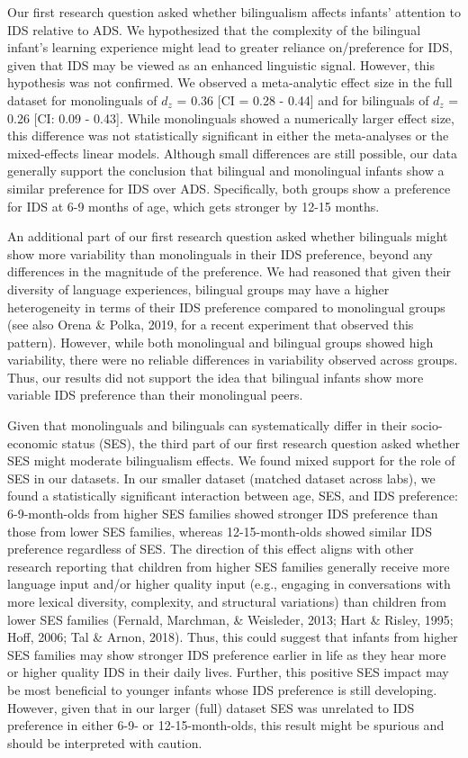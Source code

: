 \documentclass[english,,man,floatsintext]{apa6}
\begin{document}
Our first research question asked whether bilingualism affects infants' attention to IDS relative to ADS. We hypothesized that the complexity of the bilingual infant's learning experience might lead to greater reliance on/preference for IDS, given that IDS may be viewed as an enhanced linguistic signal. However, this hypothesis was not confirmed. We observed a meta-analytic effect size in the full dataset for monolinguals of \(d_z\) =
0.36 {[}CI = 0.28 - 0.44{]} and for bilinguals of \(d_z\) = 0.26 {[}CI: 0.09 - 0.43{]}. While monolinguals showed a numerically larger effect size, this difference was not statistically significant in either the meta-analyses or the mixed-effects linear models. Although small differences are still possible, our data generally support the conclusion that bilingual and monolingual infants show a similar preference for IDS over ADS. Specifically, both groups show a preference for IDS at 6-9 months of age, which gets stronger by 12-15 months.

An additional part of our first research question asked whether bilinguals might show more variability than monolinguals in their IDS preference, beyond any differences in the magnitude of the preference. We had reasoned that given their diversity of language experiences, bilingual groups may have a higher heterogeneity in terms of their IDS preference compared to monolingual groups (see also Orena \& Polka, 2019, for a recent experiment that observed this pattern). However, while both monolingual and bilingual groups showed high variability, there were no reliable differences in variability observed across groups. Thus, our results did not support the idea that bilingual infants show more variable IDS preference than their monolingual peers.

Given that monolinguals and bilinguals can systematically differ in their socio-economic status (SES), the third part of our first research question asked whether SES might moderate bilingualism effects. We found mixed support for the role of SES in our datasets. In our smaller dataset (matched dataset across labs), we found a statistically significant interaction between age, SES, and IDS preference: 6-9-month-olds from higher SES families showed stronger IDS preference than those from lower SES families, whereas 12-15-month-olds showed similar IDS preference regardless of SES. The direction of this effect aligns with other research reporting that children from higher SES families generally receive more language input and/or higher quality input (e.g., engaging in conversations with more lexical diversity, complexity, and structural variations) than children from lower SES families (Fernald, Marchman, \& Weisleder, 2013; Hart \& Risley, 1995; Hoff, 2006; Tal \& Arnon, 2018). Thus, this could suggest that infants from higher SES families may show stronger IDS preference earlier in life as they hear more or higher quality IDS in their daily lives. Further, this positive SES impact may be most beneficial to younger infants whose IDS preference is still developing. However, given that in our larger (full) dataset SES was unrelated to IDS preference in either 6-9- or 12-15-month-olds, this result might be spurious and should be interpreted with caution.
\end{document}
